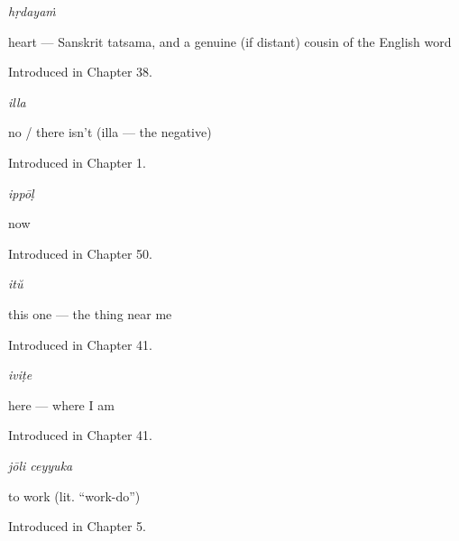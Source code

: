 \noindent\begin{minipage}[t]{\linewidth}
\raggedright
\textbf{}\enspace\emph{hṛdayaṁ}\par
\small heart — Sanskrit tatsama, and a genuine (if distant) cousin of the English word\par
\footnotesize Introduced in Chapter 38.
\end{minipage}\par\medskip

\noindent\begin{minipage}[t]{\linewidth}
\raggedright
\textbf{}\enspace\emph{illa}\par
\small no / there isn't (illa — the negative)\par
\footnotesize Introduced in Chapter 1.
\end{minipage}\par\medskip

\noindent\begin{minipage}[t]{\linewidth}
\raggedright
\textbf{}\enspace\emph{ippōḷ}\par
\small now\par
\footnotesize Introduced in Chapter 50.
\end{minipage}\par\medskip

\noindent\begin{minipage}[t]{\linewidth}
\raggedright
\textbf{}\enspace\emph{itŭ}\par
\small this one — the thing near me\par
\footnotesize Introduced in Chapter 41.
\end{minipage}\par\medskip

\noindent\begin{minipage}[t]{\linewidth}
\raggedright
\textbf{}\enspace\emph{iviṭe}\par
\small here — where I am\par
\footnotesize Introduced in Chapter 41.
\end{minipage}\par\medskip

\noindent\begin{minipage}[t]{\linewidth}
\raggedright
\textbf{ }\enspace\emph{jōli ceyyuka}\par
\small to work (lit. \textquotedblleft{}work-do\textquotedblright{})\par
\footnotesize Introduced in Chapter 5.
\end{minipage}\par\medskip

